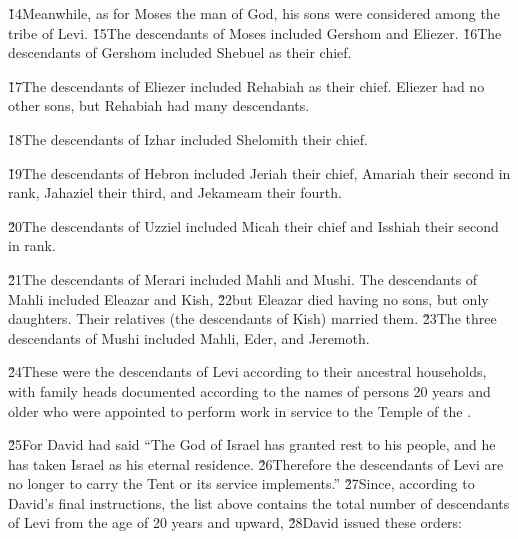 \v{14}Meanwhile, as for Moses the man of God, his sons were considered among the tribe of Levi. \v{15}The descendants of Moses included Gershom and Eliezer. \v{16}The descendants of Gershom included Shebuel as their chief.

\v{17}The descendants of Eliezer included Rehabiah as their chief. Eliezer had no other sons, but Rehabiah had many descendants.

\v{18}The descendants of Izhar included Shelomith their chief.

\v{19}The descendants of Hebron included Jeriah their chief, Amariah their second in rank, Jahaziel their third, and Jekameam their fourth.

\v{20}The descendants of Uzziel included Micah their chief and Isshiah their second in rank.

\v{21}The descendants of Merari included Mahli and Mushi. The descendants of Mahli included Eleazar and Kish, \v{22}but Eleazar died having no sons, but only daughters. Their relatives (the descendants of Kish) married them. \v{23}The three descendants of Mushi included Mahli, Eder, and Jeremoth.

\v{24}These were the descendants of Levi according to their ancestral households, with family heads documented according to the names of persons 20 years and older who were appointed to perform work in service to the Temple of the .

\v{25}For David had said ``The  God of Israel has granted rest to his people, and he has taken Israel as his eternal residence. \v{26}Therefore the descendants of Levi are no longer to carry the Tent or its service implements.'' \v{27}Since, according to David's final instructions, the list above contains the total number of descendants of Levi from the age of 20 years and upward, \v{28}David issued these orders:

